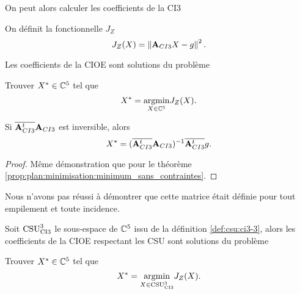     On peut alors calculer les coefficients de la CI3
    \begin{defn}
      On définit la fonctionnelle \(J_Z\)
      \begin{equation*}
        J_Z(X) = \norm{{\mA}_{CI3}X - {g}}^2.
      \end{equation*}
    \end{defn}
    \begin{defn}

      Les coefficients de la CIOE sont solutions du problème

      Trouver \(X^* \in \CC^5\) tel que
      \begin{equation*}
        X^* = \argmin{X\in \CC^5}  J_Z(X).
      \end{equation*}
    \end{defn}

    \begin{prop}
      \label{prop:sphere:minimisation:minimum_sans_contraintes}
      Si \(\conj{\mA_{CI3}^t}\mA_{CI3}\) est inversible, alors
      \begin{equation*}
        X^* = (\conj{\mA_{CI3}^t}\mA_{CI3})^{-1}\conj{\mA_{CI3}^t}g.
      \end{equation*}
    \end{prop}

    \begin{proof}
      Même démonstration que pour le théorème \ref{prop:plan:minimisation:minimum_sans_contraintes}.
    \end{proof}

    Nous n'avons pas réussi à démontrer que cette matrice était définie pour tout empilement et toute incidence.

    \begin{defn}

      Soit \(\CSU[3]{CI3}\) le sous-espace de \(\CC^5\) issu de la définition \ref{def:csu:ci3-3}, alors les coefficients de la CIOE respectant les CSU sont solutions du problème

      Trouver \(X^* \in \CC^5\) tel que
      \begin{equation*}
        X^* = \argmin{X\in \CSU[3]{CI3}}  J_Z(X).
      \end{equation*}
    \end{defn}

